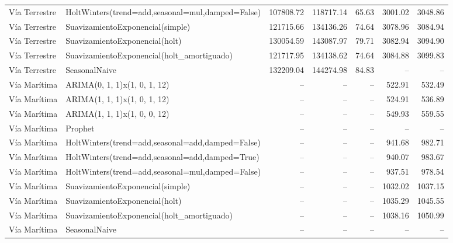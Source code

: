 \begin{table}[H]
{\begin{tabular}{llrrrrr}
Vía Terrestre & HoltWinters(trend=add,seasonal=mul,damped=False) & 107808.72 & 118717.14 & 65.63 & 3001.02 & 3048.86 \\
Vía Terrestre & SuavizamientoExponencial(simple) & 121715.66 & 134136.26 & 74.64 & 3078.96 & 3084.94 \\
Vía Terrestre & SuavizamientoExponencial(holt) & 130054.59 & 143087.97 & 79.71 & 3082.94 & 3094.90 \\
Vía Terrestre & SuavizamientoExponencial(holt\_amortiguado) & 121717.95 & 134138.62 & 74.64 & 3084.88 & 3099.83 \\
Vía Terrestre & SeasonalNaive & 132209.04 & 144274.98 & 84.83 & -- & -- \\
Vía Marítima & ARIMA(0, 1, 1)x(1, 0, 1, 12) & -- & -- & -- & 522.91 & 532.49 \\
Vía Marítima & ARIMA(1, 1, 1)x(1, 0, 1, 12) & -- & -- & -- & 524.91 & 536.89 \\
Vía Marítima & ARIMA(1, 1, 1)x(1, 0, 0, 12) & -- & -- & -- & 549.93 & 559.55 \\
Vía Marítima & Prophet & -- & -- & -- & -- & -- \\
Vía Marítima & HoltWinters(trend=add,seasonal=add,damped=False) & -- & -- & -- & 941.68 & 982.71 \\
Vía Marítima & HoltWinters(trend=add,seasonal=add,damped=True) & -- & -- & -- & 940.07 & 983.67 \\
Vía Marítima & HoltWinters(trend=add,seasonal=mul,damped=False) & -- & -- & -- & 937.51 & 978.54 \\
Vía Marítima & SuavizamientoExponencial(simple) & -- & -- & -- & 1032.02 & 1037.15 \\
Vía Marítima & SuavizamientoExponencial(holt) & -- & -- & -- & 1035.29 & 1045.55 \\
Vía Marítima & SuavizamientoExponencial(holt\_amortiguado) & -- & -- & -- & 1038.16 & 1050.99 \\
Vía Marítima & SeasonalNaive & -- & -- & -- & -- & -- \\
\bottomrule
\end{tabular}
}
\end{table}
